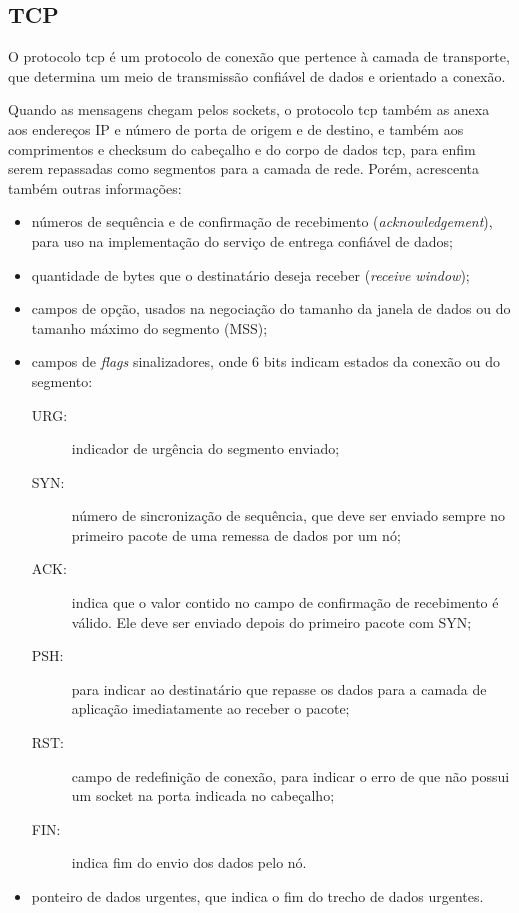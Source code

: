 
\subsection*{TCP}

O protocolo \gls*{tcp} é um protocolo de conexão que pertence à camada de transporte,
que determina um meio de transmissão confiável de dados e orientado a conexão.

Quando as mensagens chegam pelos \glspl*{socket}, o protocolo \gls*{tcp} também as anexa
aos endereços IP e número de porta de origem e de destino, e também aos comprimentos e
\gls*{checksum} do cabeçalho e do corpo de dados \gls*{tcp}, para enfim serem repassadas
como segmentos para a camada de rede. Porém, acrescenta também outras informações:

\begin{itemize}
    \item números de sequência e de confirmação de recebimento (\emph{acknowledgement}),
        para uso na implementação do serviço de entrega confiável de dados;

    \item quantidade de bytes que o destinatário deseja receber (\emph{receive window});

    \item campos de opção, usados na negociação do tamanho da janela de dados ou do
        tamanho máximo do segmento (MSS);

    \item campos de \emph{flags} sinalizadores, onde 6 bits indicam estados da conexão
        ou do segmento:
        \begin{description}
            \item[URG:] indicador de urgência do segmento enviado;

            \item[SYN:] número de sincronização de sequência, que deve ser enviado
                sempre no primeiro pacote de uma remessa de dados por um nó;

            \item[ACK:] indica que o valor contido no campo de confirmação de
                recebimento é válido. Ele deve ser enviado depois do primeiro pacote com
                SYN;

            \item[PSH:] para indicar ao destinatário que repasse os dados para a camada
                de aplicação imediatamente ao receber o pacote;

            \item[RST:] campo de redefinição de conexão, para indicar o erro de que não
                possui um \gls*{socket} na porta indicada no cabeçalho;

            \item[FIN:] indica fim do envio dos dados pelo nó.
        \end{description}

    \item ponteiro de dados urgentes, que indica o fim do trecho de dados urgentes.
\end{itemize}

